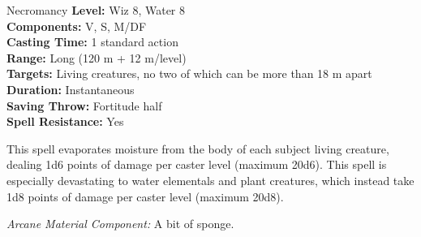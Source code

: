 {Necromancy}
{
	\textbf{Level:}
	Wiz 8, Water 8\\
	\textbf{Components:}
	V, S, M/DF\\
	\textbf{Casting Time:}
	1 standard action\\
	\textbf{Range:}
	Long (120 m + 12 m/level)\\
	\textbf{Targets:}
	Living creatures, no two of which can be more than 18 m apart\\
	\textbf{Duration:}
	Instantaneous\\
	\textbf{Saving Throw:}
	Fortitude half\\
	\textbf{Spell Resistance:}
	Yes\\
}
{
	This spell evaporates moisture from the body of each subject living creature, dealing 1d6 points of damage per caster level (maximum 20d6). This spell is especially devastating to water elementals and plant creatures, which instead take 1d8 points of damage per caster level (maximum 20d8).

	\textit{Arcane Material Component:}
	A bit of sponge.

}
